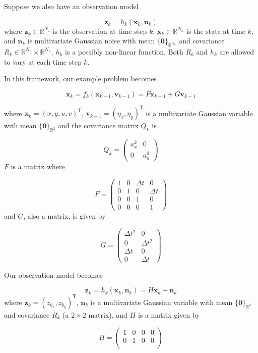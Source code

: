 \documentclass{article}
\newcommand{\tr}{^\mathsf{T}}
\begin{document}
Suppose we also have an observation model

\[\mathbf{z}_k = h_k(\mathbf{x}_{k}, \mathbf{n}_k)\]
where $\mathbf{z}_k \in \mathbb{R}^{N_z}$ is the observation at time step $k$, 
$\mathbf{x}_k \in \mathbb{R}^{N_x}$ is the state at time $k$, and 
$\mathbf{n}_k$ is multivariate Gaussian noise with mean 
$\{\mathbf{0}\}_{\mathbb{R}^{N_n}}$ and covariance 
$R_k \in \mathbb{R}^{N_n} \times \mathbb{R}^{N_n}$.  $h_k$ is a possibly
non-linear function.  Both $R_k$ and $h_k$ are allowed to vary at each time
step $k$.

In this framework, our example problem becomes

\[\mathbf{x}_k = f_k(\mathbf{x}_{k-1}, \mathbf{v}_{k-1}) = 
F\mathbf{x}_{k-1} + G\mathbf{v}_{k-1}\]

where $\mathbf{x}_k = (x,y,u,v)\tr$, 
$\mathbf{v}_{k-1} = (\eta_x,\eta_y)\tr$ is a 
multivariate Gaussian variable with mean $\{\mathbf{0}\}_{\mathbb{R}^2}$ and
the covariance matrix $Q_k$ is

\[Q_k = \begin{pmatrix} a_x^2 & 0 \\
0 & a_y^2
\end{pmatrix}\] 
$F$ is a matrix where

\[F = \begin{pmatrix}
1 & 0 & \Delta t & 0 \\
0 & 1 & 0        & \Delta t \\
0 & 0 & 1        & 0 \\
0 & 0 & 0        & 1
\end{pmatrix}\]
and $G$, also a matrix, is given by

\[G = \begin{pmatrix}
\Delta t^2 & 0 \\
0          & \Delta t^2 \\
\Delta t   & 0 \\
0          & \Delta t
\end{pmatrix}\]

Our observation model becomes

\[\mathbf{z}_k = h_k(\mathbf{x}_k, \mathbf{n}_k) = H\mathbf{x}_k + \mathbf{n}_k\]
where $\mathbf{z}_k = (z_{k_x}, z_{k_y})\tr$, $\mathbf{n}_k$ is a multivariate 
Gaussian variable with mean $\{\mathbf{0}\}_{\mathbb{R}^2}$ and 
covariance $R_k$ (a $2 \times 2$ matrix), and $H$ is a matrix given by

\[H = \begin{pmatrix}
1 & 0 & 0 & 0 \\
0 & 1 & 0 & 0 \\
\end{pmatrix}\]
\end{document}
